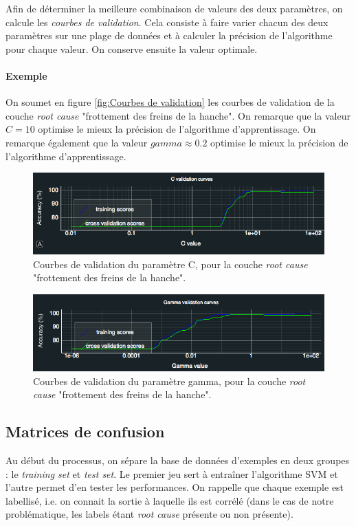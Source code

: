 Afin de déterminer la meilleure combinaison de valeurs des deux paramètres, on calcule les \emph{courbes de validation}. Cela consiste à faire varier chacun des deux paramètres sur une plage de données et à calculer la précision de l'algorithme pour chaque valeur. On conserve ensuite la valeur optimale. 

 \paragraph{Exemple}
 On soumet en figure \ref{fig:Courbes de validation} les courbes de validation de la couche \emph{root cause} "frottement des freins de la hanche". On remarque que la valeur $C = 10$ optimise le mieux la précision de l'algorithme d'apprentissage. On remarque également que la valeur $gamma \approx 0.2$ optimise le mieux la précision de l'algorithme d'apprentissage.

 \begin{figure}[h]
 	\centering\includegraphics[width=12cm]{images/courbe_validation_c.png}
 	\caption[Courbes de validation du paramètre C]{Courbes de validation du paramètre C, pour la couche \emph{root cause} "frottement des freins de la hanche".}
 	\label{fig:Courbes de validation du paramètre C}
 \end{figure}
 
  \begin{figure}[h]
  	\centering\includegraphics[width=12cm]{images/courbe_validation_gamma.png}
  	\caption[Courbes de validation du paramètre gamma]{Courbes de validation du paramètre gamma, pour la couche \emph{root cause} "frottement des freins de la hanche".}
  	\label{fig:Courbes de validation du paramètre gamma}
  \end{figure}
  
\subsection{Matrices de confusion}
\label{Industrialisation du produit: Performances de la solution:Matrices de confusion}
Au début du processus, on sépare la base de données d'exemples en deux groupes : le \emph{training set} et \emph{test set}. Le premier jeu sert à entraîner l'algorithme SVM et l'autre permet d'en tester les performances. On rappelle que chaque exemple est labellisé, i.e. on connait  la sortie à laquelle ils est corrélé (dans le cas de notre problématique, les labels étant \emph{root cause} présente ou non présente).
\newline

